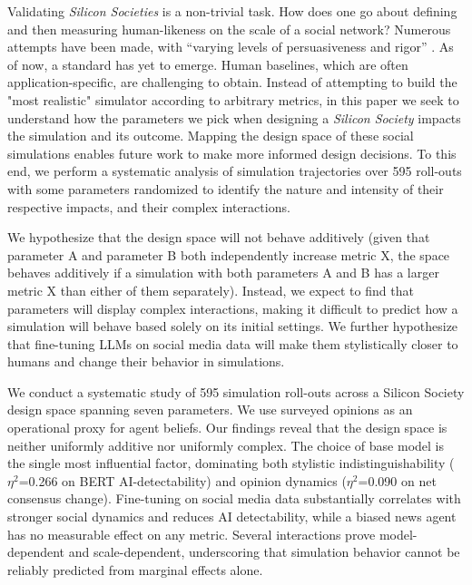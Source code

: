 \documentclass{article} %
\begin{document}
Validating \textit{Silicon Societies} is a  non-trivial task. How does one go about defining and then measuring human-likeness on the scale of a social network? Numerous attempts have been made, with ``varying levels of persuasiveness and rigor'' \citep{larooij2025largelanguagemodelssolve}. As of now, a standard has yet to emerge. Human baselines, which are often application-specific, are challenging to obtain. 
Instead of attempting to build the "most realistic" simulator according to arbitrary metrics, in this paper  we seek to understand how the parameters we pick when designing a \textit{Silicon Society} impacts the simulation and its outcome. %
Mapping the design space of these social simulations enables future work to make more informed design decisions. %
To this end, we perform a systematic analysis of simulation trajectories over 595 roll-outs with some parameters randomized to identify the nature and intensity of their respective impacts, and their complex interactions.


We hypothesize that the design space will not behave additively (given that parameter A and parameter B both independently increase metric X, the space behaves additively if a simulation with both parameters A and B has a larger metric X than either of them separately). Instead, we expect to find that parameters will display complex interactions, making it difficult to predict how a simulation will behave based solely on its initial settings. We further hypothesize that fine-tuning LLMs on social media data will make them stylistically closer to humans and change their behavior in simulations.

We conduct a systematic study of 595 simulation roll-outs across a Silicon Society design space spanning seven parameters. We use surveyed opinions as an operational proxy for agent beliefs. Our findings reveal that the design space is neither uniformly additive nor uniformly complex. The choice of base model is the single most influential factor, dominating both stylistic indistinguishability ($\eta^2$=0.266 on BERT AI-detectability) and opinion dynamics ($\eta^2$=0.090 on net consensus change). Fine-tuning on social media data substantially correlates with stronger social dynamics and reduces AI detectability, while a biased news agent has no measurable effect on any metric. Several interactions prove model-dependent and scale-dependent, underscoring that simulation behavior cannot be reliably predicted from marginal effects alone.
\end{document}
